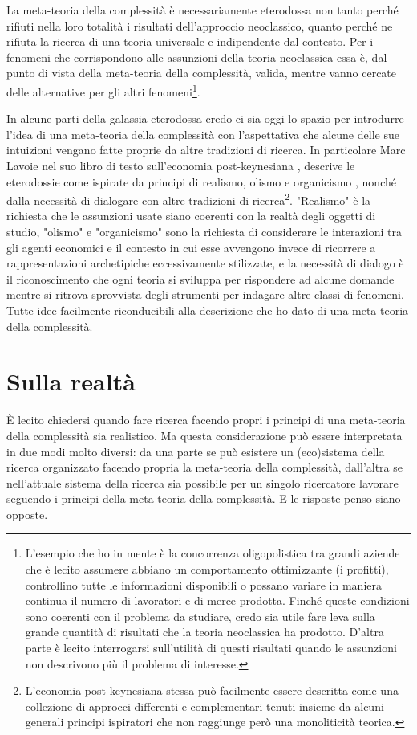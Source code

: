 \documentclass[a4paper, headings=standardclasses]{scrartcl}
\begin{document}
La meta-teoria della complessità è necessariamente eterodossa \parencite{fontana2010} non tanto perché rifiuti nella loro totalità i risultati dell'approccio neoclassico, quanto perché ne rifiuta la ricerca di una teoria universale e indipendente dal contesto.
Per i fenomeni che corrispondono alle assunzioni della teoria neoclassica essa è, dal punto di vista della meta-teoria della complessità, valida, mentre vanno cercate delle alternative per gli altri fenomeni\footnote{L'esempio che ho in mente è la concorrenza oligopolistica tra grandi aziende che è lecito assumere abbiano un comportamento ottimizzante (i profitti), controllino tutte le informazioni disponibili o possano variare in maniera continua il numero di lavoratori e di merce prodotta. Finché queste condizioni sono coerenti con il problema da studiare, credo sia utile fare leva sulla grande quantità di risultati che la teoria neoclassica ha prodotto. D'altra parte è lecito interrogarsi sull'utilità di questi risultati quando le assunzioni non descrivono più il problema di interesse.}.

In alcune parti della galassia eterodossa credo ci sia oggi lo spazio per introdurre l'idea di una meta-teoria della complessità con l'aspettativa che alcune delle sue intuizioni vengano fatte proprie da altre tradizioni di ricerca.
In particolare Marc Lavoie nel suo libro di testo sull'economia post-keynesiana \parencite{lavoie2022}, descrive le eterodossie come ispirate da principi di realismo, olismo e organicismo \parencite[][p. 12]{lavoie2022}, nonché dalla necessità di dialogare con altre tradizioni di ricerca\footnote{L'economia post-keynesiana stessa può facilmente essere descritta come una collezione di approcci differenti e complementari tenuti insieme da alcuni generali principi ispiratori che non raggiunge però una monoliticità teorica.}. "Realismo" è la richiesta che le assunzioni usate siano coerenti con la realtà degli oggetti di studio, "olismo" e "organicismo" sono la richiesta di considerare le interazioni tra gli agenti economici e il contesto in cui esse avvengono invece di ricorrere a rappresentazioni archetipiche eccessivamente stilizzate, e la necessità di dialogo è il riconoscimento che ogni teoria si sviluppa per rispondere ad alcune domande mentre si ritrova sprovvista degli strumenti per indagare altre classi di fenomeni.
Tutte idee facilmente riconducibili alla descrizione che ho dato di una meta-teoria della complessità. 

\section{Sulla realtà}
È lecito chiedersi quando fare ricerca facendo propri i principi di una meta-teoria della complessità sia realistico.
Ma questa considerazione può essere interpretata in due modi molto diversi: da una parte se può esistere un (eco)sistema della ricerca organizzato facendo propria la meta-teoria della complessità, dall'altra se nell'attuale sistema della ricerca sia possibile per un singolo ricercatore lavorare seguendo i principi della meta-teoria della complessità. E le risposte penso siano opposte.
\end{document}
